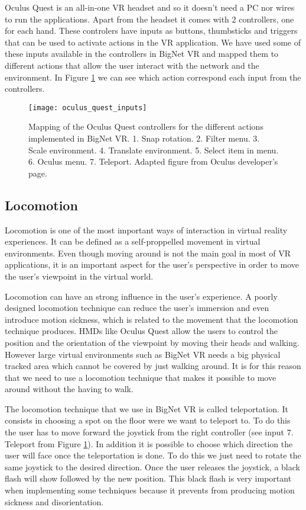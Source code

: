 Oculus Quest is an all-in-one VR headset and so it doesn't need a PC nor wires to run the applications. Apart from the headset it comes with 2 controllers, one for each hand. These controlers have inputs as buttons, thumbsticks and triggers that can be used to activate actions in the VR application. We have used some of these inputs available in the controllers in BigNet VR and mapped them to different actions that allow the user interact with the network and the environment. In Figure \ref{fig:oculus_quest_inputs} we can see which action correspond each input from the controllers.

\begin{figure}[h!]
    \centering%
    \texttt{[image: oculus\_quest\_inputs]}
    \caption{Mapping of the Oculus Quest controllers for the different actions implemented in BigNet VR. 1. Snap rotation. 2. Filter menu. 3. Scale environment. 4. Translate environment. 5. Select item in menu. 6. Oculus menu. 7. Teleport. Adapted figure from Oculus developer's page\cite{oculus_inputs}.}
    \label{fig:oculus_quest_inputs}
\end{figure}%

\subsection{Locomotion}
Locomotion is one of the most important ways of interaction in virtual reality experiences. It can be defined as a self-proppelled movement in virtual environments. Even though moving around is not the main goal in most of VR applications, it is an important aspect for the user's perspective in order to move the user's viewpoint in the virtual world.

Locomotion can have an strong influence in the user's experience. A poorly designed locomotion technique can reduce the user's immersion and even introduce motion sickness, which is related to the movement that the locomotion technique produces. HMDs like Oculus Quest allow the users to control the position and the orientation of the viewpoint by moving their heads and walking. However large virtual environments such as BigNet VR needs a big physical tracked area which cannot be covered by just walking around. It is for this reason that we need to use a locomotion technique that makes it possible to move around without the having to walk\cite{locomotion_technique}.

The locomotion technique that we use in BigNet VR is called teleportation. It consists in choosing a spot on the floor were we want to teleport to. To do this the user has to move forward the joystick from the right controller (see input 7. Teleport from Figure \ref{fig:oculus_quest_inputs}). In addition it is possible to choose which direction the user will face once the teleportation is done. To do this we just need to rotate the same joystick to the desired direction. Once the user releases the joystick, a black flash will show followed by the new position. This black flash is very important when implementing some techniques because it prevents from producing motion sickness and disorientation.

